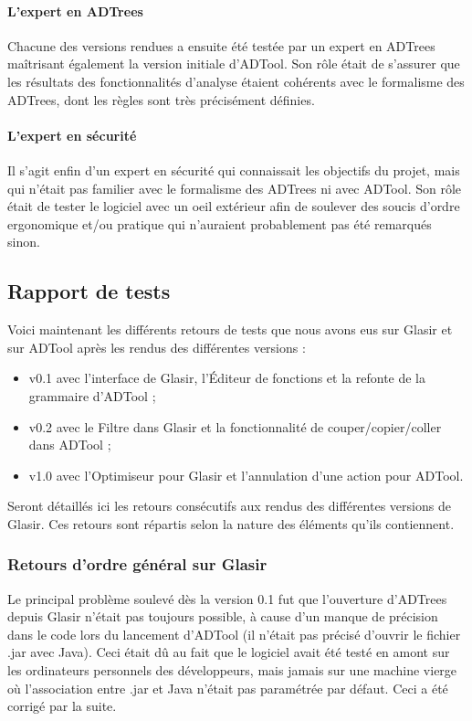 \paragraph{L'expert en ADTrees} Chacune des versions rendues a ensuite été testée par un expert en ADTrees maîtrisant également la version initiale d'ADTool. Son rôle était de s'assurer que les résultats des fonctionnalités d'analyse étaient cohérents avec le formalisme des ADTrees, dont les règles sont très précisément définies.

\paragraph{L'expert en sécurité} Il s'agit enfin d'un expert en sécurité qui connaissait les objectifs du projet, mais qui n'était pas familier avec le formalisme des ADTrees ni avec ADTool. Son rôle était de tester le logiciel avec un oeil \og extérieur \fg{} afin de soulever des soucis d'ordre ergonomique et/ou pratique qui n'auraient probablement pas été remarqués sinon.

\subsection{Rapport de tests}
\label{subsec:tests}

Voici maintenant les différents retours de tests que nous avons eus sur Glasir et sur ADTool après les rendus des différentes versions : 
\begin{itemize}
	\item v0.1 avec l'interface de Glasir, l'Éditeur de fonctions et la refonte de la grammaire d'ADTool ;
	\item v0.2 avec le Filtre dans Glasir et la fonctionnalité de couper/copier/coller dans ADTool ;
	\item v1.0 avec l'Optimiseur pour Glasir et l'annulation d'une action pour ADTool.
\end{itemize}

Seront détaillés ici les retours consécutifs aux rendus des différentes versions de Glasir. Ces retours sont répartis selon la nature des éléments qu'ils contiennent.

\subsubsection{Retours d'ordre général sur Glasir}
\label{subsubsec:fonctglob}

Le principal problème soulevé dès la version 0.1 fut que l'ouverture d'ADTrees depuis Glasir n'était pas toujours possible, à cause d'un manque de précision dans le code lors du lancement d'ADTool (il n'était pas précisé d'ouvrir le fichier .jar avec Java). Ceci était dû au fait que le logiciel avait été testé en amont sur les ordinateurs personnels des développeurs, mais jamais sur une machine vierge où l'association entre .jar et Java n'était pas paramétrée par défaut. Ceci a été corrigé par la suite. 

